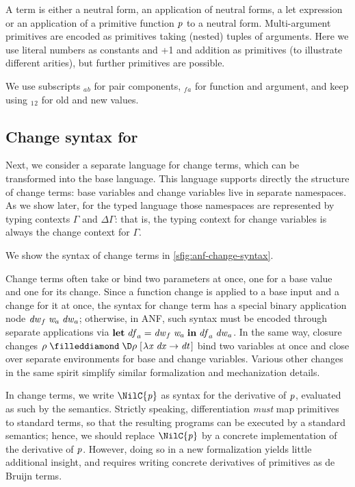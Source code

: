 A term is either a neutral form, an application of neutral forms,
a let expression or an application of a primitive function \ensuremath{\Varid{p}} to
a neutral form. Multi-argument primitives are encoded as
primitives taking (nested) tuples of arguments. Here we use
literal numbers as constants and +1 and addition as primitives (to illustrate
different arities), but further primitives are possible.

\begin{notation}
  We use subscripts ${}_a {}_b$ for pair components, ${}_f {}_a$ for
  function and argument, and keep using ${}_1 {}_2$ for old and new
  values.
\end{notation}
\subsection{Change syntax for \dilcUntau}
\label{sec:bsos-anf-change-syntax}
Next, we consider a separate language for change terms, which can
be transformed into the base language. This language supports
directly the structure of change terms: base variables and change
variables live in separate namespaces. As we show later, for the typed language
those namespaces are represented by typing contexts \ensuremath{\Gamma} and
\ensuremath{\Delta \Gamma}: that is, the typing context for change variables is
always the change context for \ensuremath{\Gamma}.

We show the syntax of change terms in \cref{sfig:anf-change-syntax}.

Change terms often take or bind two parameters at once, one for a
base value and one for its change.
Since a function change is applied to a base input
and a change for it at once, the syntax for change term has a
special binary application node \ensuremath{\Varid{dw}_f\;\Varid{w}_a\;\Varid{dw}_a}; otherwise, in ANF,
such syntax must be encoded through separate applications via
\ensuremath{\mathbf{let}\;\Varid{df}_a\mathrel{=}\Varid{dw}_f\;\Varid{w}_a\;\mathbf{in}\;\Varid{df}_a\;\Varid{dw}_a}. In the same way, closure changes
\ensuremath{\rho\mathrel{\filleddiamond}\D\rho\;[\mskip1.5mu \lambda \Varid{x}\;\Varid{dx}\to \Varid{dt}\mskip1.5mu]} bind two variables at once and
close over separate environments for base and change variables.
Various other changes in the same spirit simplify similar
formalization and mechanization details.

%
In change terms, we write \ensuremath{\NilC{\Varid{p}}} as syntax for the derivative of \ensuremath{\Varid{p}}, evaluated
as such by the semantics.
Strictly speaking, differentiation \emph{must} map
primitives to standard terms, so that the resulting programs can
be executed by a standard semantics; hence, we should replace \ensuremath{\NilC{\Varid{p}}} by a
concrete implementation of the derivative of \ensuremath{\Varid{p}}.
However, doing so in a new
formalization yields little additional insight, and requires
writing concrete derivatives of primitives as de Bruijn terms.

